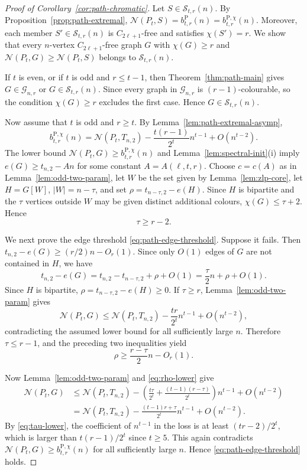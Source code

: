 \documentclass[11pt]{article}
\theoremstyle{definition}
\theoremstyle{plain}
\theoremstyle{remark}
\theoremstyle{plain}
\numberwithin{equation}{section}
\newcommand{\cG}{\mathcal G}
\newcommand{\cS}{\mathcal S}
\newcommand{\N}{\mathcal N}
\begin{document}
\begin{proof}[Proof of Corollary~\ref{cor:path-chromatic}]
Let $S\in\cS_{t,r}(n)$. By Proposition~\ref{prop:path-extremal}, $\N(P_t,S)=b^{\mathrm P}_{t,r}(n)=b^{\mathrm P,\chi}_{t,r}(n)$.
Moreover, each member $S'\in\cS_{t,r}(n)$ is $C_{2\ell+1}$-free and satisfies $\chi(S')=r$. We show that every $n$-vertex $C_{2\ell+1}$-free graph $G$ with $\chi(G)\ge r$ and $\N(P_t,G)\ge\N(P_t,S)$ belongs to $\cS_{t,r}(n)$.

If $t$ is even, or if $t$ is odd and $r\le t-1$, then Theorem~\ref{thm:path-main} gives $G\in\cG_{n,r}$ or $G\in\cS_{t,r}(n)$. Since every graph in $\cG_{n,r}$ is $(r-1)$-colourable, so the condition $\chi(G)\ge r$ excludes the first case. Hence $G\in\cS_{t,r}(n)$.

Now assume that $t$ is odd and $r\ge t$. By Lemma~\ref{lem:path-extremal-asymp},
\[
        b^{\mathrm P,\chi}_{t,r}(n)
        =\N(P_t,T_{n,2})-\frac{t(r-1)}{2^t}n^{t-1}+O(n^{t-2}).
\]
The lower bound $\N(P_t,G)\ge b^{\mathrm P,\chi}_{t,r}(n)$ and Lemma~\ref{lem:spectral-init}(i) imply $e(G)\ge t_{n,2}-An$ for some constant $A=A(\ell,t,r)$.
Choose $c=c(A)$ as in Lemma~\ref{lem:odd-two-param}, let $W$ be the set given by Lemma~\ref{lem:zlp-core}, let $H=G[W]$, $|W|=n-\tau$, and set $\rho=t_{n-\tau,2}-e(H)$. Since $H$ is bipartite and the $\tau$ vertices outside $W$ may be given distinct additional colours, $\chi(G)\le \tau+2$. Hence
\begin{equation}\label{eq:tau-lower}
        \tau\ge r-2.
\end{equation}

We next prove the edge threshold \eqref{eq:path-edge-threshold}. Suppose it fails. Then $t_{n,2}-e(G)\ge (r/2)n-O_r(1)$. Since only $O(1)$ edges of $G$ are not contained in $H$, we have
\[
        t_{n,2}-e(G)
        =t_{n,2}-t_{n-\tau,2}+\rho+O(1)
        =\frac{\tau}{2}n+\rho+O(1).
\]
Since $H$ is bipartite, $\rho=t_{n-\tau,2}-e(H)\ge0$. If $\tau\ge r$, Lemma~\ref{lem:odd-two-param} gives
\[
        \N(P_t,G)\le \N(P_t,T_{n,2})
        -\frac{tr}{2^t}n^{t-1}+O(n^{t-2}),
\]
contradicting the assumed lower bound for all sufficiently large $n$. Therefore $\tau\le r-1$, and the preceding two inequalities yield
\begin{equation}\label{eq:rho-lower}
        \rho\ge\frac{r-\tau}{2}n-O_r(1).
\end{equation}

Now Lemma~\ref{lem:odd-two-param} and \eqref{eq:rho-lower} give
\[
\begin{aligned}
        \N(P_t,G)
        &\le \N(P_t,T_{n,2})
        -\left(\frac{t\tau}{2^t}+\frac{(t-1)(r-\tau)}{2^t}\right)n^{t-1}
        +O(n^{t-2})\\
        &=\N(P_t,T_{n,2})-\frac{(t-1)r+\tau}{2^t}n^{t-1}+O(n^{t-2}).
\end{aligned}
\]
By \eqref{eq:tau-lower}, the coefficient of $n^{t-1}$ in the loss is at least $(tr-2)/2^t$, which is larger than $t(r-1)/2^t$ since $t\ge5$. This again contradicts $\N(P_t,G)\ge b^{\mathrm P,\chi}_{t,r}(n)$ for all sufficiently large $n$. Hence \eqref{eq:path-edge-threshold} holds.


\end{proof}
\end{document}
